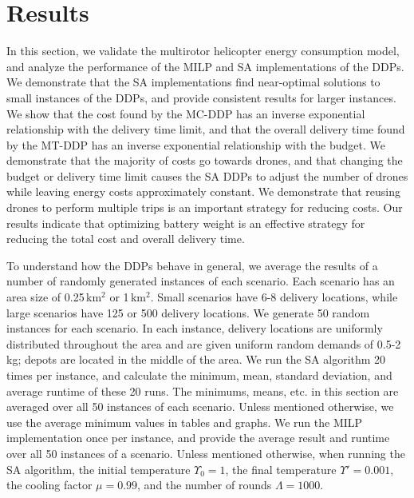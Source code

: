 \documentclass[journal]{IEEEtran}
\begin{document}
\section{Results}
\label{sec:results}

In this section, we validate the multirotor helicopter energy consumption model, and analyze the performance of the MILP and SA implementations of the DDPs. We demonstrate that the SA implementations find near-optimal solutions to small instances of the DDPs, and provide consistent results for larger instances. We show that the cost found by the MC-DDP has an inverse exponential relationship with the delivery time limit, and that the overall delivery time found by the MT-DDP has an inverse exponential relationship with the budget. We demonstrate that the majority of costs go towards drones, and that changing the budget or delivery time limit causes the SA DDPs to adjust the number of drones while leaving energy costs approximately constant. We demonstrate that reusing drones to perform multiple trips is an important strategy for reducing costs. Our results indicate that optimizing battery weight is an effective strategy for reducing the total cost and overall delivery time.

To understand how the DDPs behave in general, we average the results of a number of randomly generated instances of each scenario. Each scenario has an area size of 0.25\,km$^2$ or 1\,km$^2$. Small scenarios have 6-8 delivery locations, while large scenarios have 125 or 500 delivery locations. We generate 50 random instances for each scenario. In each instance, delivery locations are uniformly distributed throughout the area and are given uniform random demands of 0.5-2\,kg; depots are located in the middle of the area. We run the SA algorithm 20 times per instance, and calculate the minimum, mean, standard deviation, and average runtime of these 20 runs. The minimums, means, etc. in this section are averaged over all 50 instances of each scenario. Unless mentioned otherwise, we use the average minimum values in tables and graphs. We run the MILP implementation once per instance, and provide the average result and runtime over all 50 instances of a scenario. Unless mentioned otherwise, when running the SA algorithm, the initial temperature ${\ensuremath{{\ensuremath{\Upsilon}}_0}}=1$, the final temperature ${\ensuremath{{\ensuremath{\Upsilon}}'}}=0.001$, the cooling factor ${\ensuremath{\mu}}=0.99$, and the number of rounds ${\ensuremath{\Lambda}}=1000$.
\end{document}
